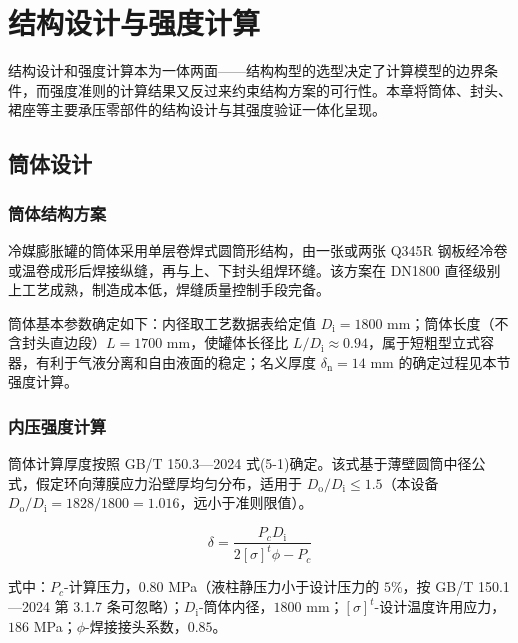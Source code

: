 
\chapter{结构设计与强度计算}

\label{chap:struct-design}

结构设计和强度计算本为一体两面——结构构型的选型决定了计算模型的边界条件，而强度准则的计算结果又反过来约束结构方案的可行性。本章将筒体、封头、裙座等主要承压零部件的结构设计与其强度验证一体化呈现。

\section{筒体设计}

\subsection{筒体结构方案}

冷媒膨胀罐的筒体采用单层卷焊式圆筒形结构，由一张或两张 Q345R 钢板经冷卷或温卷成形后焊接纵缝，再与上、下封头组焊环缝。该方案在 DN1800 直径级别上工艺成熟，制造成本低，焊缝质量控制手段完备\cite{nbt47013-2015}。

筒体基本参数确定如下：内径取工艺数据表给定值 $D_{\mathrm{i}} = 1800$ mm；筒体长度（不含封头直边段）$L = 1700$ mm，使罐体长径比 $L/D_{\mathrm{i}} \approx 0.94$，属于短粗型立式容器，有利于气液分离和自由液面的稳定；名义厚度 $\delta_{\mathrm{n}} = 14$ mm 的确定过程见本节强度计算。

\subsection{内压强度计算}

筒体计算厚度按照 GB/T 150.3—2024 式(5-1)确定。该式基于薄壁圆筒中径公式，假定环向薄膜应力沿壁厚均匀分布，适用于 $D_{\mathrm{o}}/D_{\mathrm{i}} \le 1.5$（本设备 $D_{\mathrm{o}}/D_{\mathrm{i}} = 1828/1800 = 1.016$，远小于准则限值）。

\begin{equation}
\delta = \frac{P_c D_{\mathrm{i}}}{2[\sigma]^t \phi - P_c}
\label{eq:cyl-delta}
\end{equation}

式中：$P_c$-计算压力，$0.80$ MPa（液柱静压力小于设计压力的 $5\%$，按 GB/T 150.1—2024 第 3.1.7 条可忽略）；$D_{\mathrm{i}}$-筒体内径，$1800$ mm；$[\sigma]^t$-设计温度许用应力，$186$ MPa；$\phi$-焊接接头系数，$0.85$。

